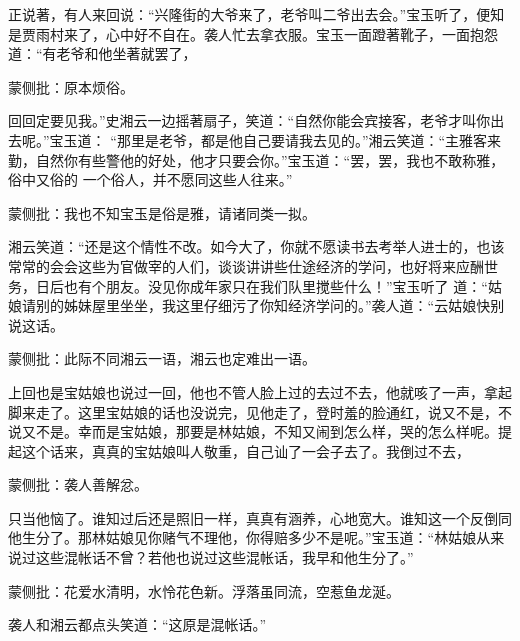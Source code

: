 \begin{parag}


    正说著，有人来回说：“兴隆街的大爷来了，老爷叫二爷出去会。”宝玉听了，便知是贾雨村来了，心中好不自在。袭人忙去拿衣服。宝玉一面蹬著靴子，一面抱怨道：“有老爷和他坐著就罢了，\begin{note}蒙侧批：原本烦俗。\end{note}回回定要见我。”史湘云一边摇著扇子，笑道：“自然你能会宾接客，老爷才叫你出去呢。”宝玉道： “那里是老爷，都是他自己要请我去见的。”湘云笑道：“主雅客来勤，自然你有些警他的好处，他才只要会你。”宝玉道：“罢，罢，我也不敢称雅，俗中又俗的 一个俗人，并不愿同这些人往来。”\begin{note}蒙侧批：我也不知宝玉是俗是雅，请诸同类一拟。\end{note}湘云笑道：“还是这个情性不改。如今大了，你就不愿读书去考举人进士的，也该常常的会会这些为官做宰的人们，谈谈讲讲些仕途经济的学问，也好将来应酬世务，日后也有个朋友。没见你成年家只在我们队里搅些什么！”宝玉听了 道：“姑娘请别的姊妹屋里坐坐，我这里仔细污了你知经济学问的。”袭人道：“云姑娘快别说这话。\begin{note}蒙侧批：此际不同湘云一语，湘云也定难出一语。\end{note}上回也是宝姑娘也说过一回，他也不管人脸上过的去过不去，他就咳了一声，拿起脚来走了。这里宝姑娘的话也没说完，见他走了，登时羞的脸通红，说又不是，不说又不是。幸而是宝姑娘，那要是林姑娘，不知又闹到怎么样，哭的怎么样呢。提起这个话来，真真的宝姑娘叫人敬重，自己讪了一会子去了。我倒过不去，\begin{note}蒙侧批：袭人善解忿。\end{note}只当他恼了。谁知过后还是照旧一样，真真有涵养，心地宽大。谁知这一个反倒同他生分了。那林姑娘见你赌气不理他，你得赔多少不是呢。”宝玉道：“林姑娘从来说过这些混帐话不曾？若他也说过这些混帐话，我早和他生分了。”\begin{note}蒙侧批：花爱水清明，水怜花色新。浮落虽同流，空惹鱼龙涎。\end{note}袭人和湘云都点头笑道：“这原是混帐话。”
\end{parag}



